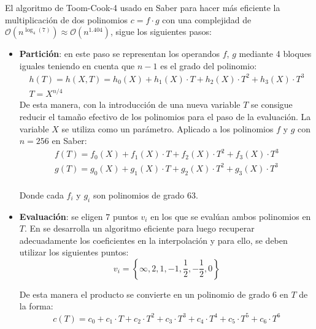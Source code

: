 El algoritmo de Toom-Cook-4 usado en Saber \cite{toomcook4} para hacer más eficiente la multiplicación de dos polinomios \(c=f\cdot g\) con una complejidad de \(\mathcal{O}(n^{\log_4(7)})\approx\mathcal{O}(n^{1.404})\), sigue los siguientes pasos:
\begin{itemize}
	\item \textbf{Partición}: en este paso se representan los operandos \(f\), \(g\) mediante 4 bloques iguales teniendo en cuenta que \(n-1\) es el grado del polinomio:
	\begin{equation}
		\begin{array}{l}
			h(T)=h(X,T)=h_0(X)+h_1(X)\cdot T+h_2(X)\cdot T^2+h_3(X)\cdot T^3\\
			T=X^{n/4}
		\end{array}
	\end{equation}
	\newpage
	De esta manera, con la introducción de una nueva variable \(T\) se consigue reducir el tamaño efectivo de los polinomios para el paso de la evaluación. La variable \(X\) se utiliza como un parámetro. Aplicado a los polinomios \(f\) y \(g\) con \(n=256\) en Saber:
	\begin{equation}
		\begin{array}{l}
		f(T)=f_0(X)+f_1(X)\cdot T+f_2(X)\cdot T^2+f_3(X)\cdot T^3\\
		g(T)=g_0(X)+g_1(X)\cdot T+g_2(X)\cdot T^2+g_3(X)\cdot T^3\\
		\end{array}
	\end{equation}
	
	Donde cada \(f_i\) y \(g_i\) son polinomios de grado \(63\).
	
	\item \textbf{Evaluación}: se eligen \(7\) puntos \(v_i\) en los que se evalúan ambos polinomios en \(T\). En \cite{toomcook4} se desarrolla un algoritmo eficiente para luego recuperar adecuadamente los coeficientes en la interpolación y para ello, se deben utilizar los siguientes puntos:
	\begin{equation}
		v_i=\left\{\infty, 2, 1, -1, \dfrac{1}{2}, -\dfrac{1}{2},0\right\}
	\end{equation}
	
	De esta manera el producto se convierte en un polinomio de grado \(6\) en \(T\) de la forma:
	\begin{equation}
		c(T)=c_0+c_1\cdot T+c_2\cdot T^2+c_3\cdot T^3+c_4\cdot T^4+c_5\cdot T^5+c_6\cdot T^6
	\end{equation}
	

\end{itemize}
